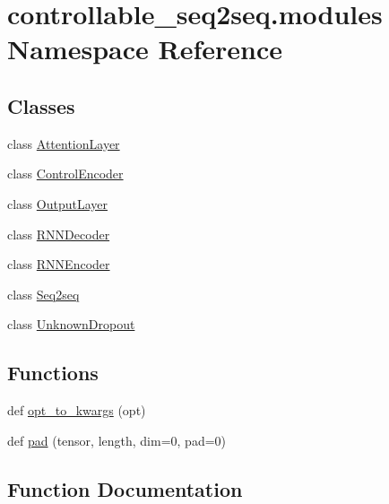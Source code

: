 \hypertarget{namespacecontrollable__seq2seq_1_1modules}{}\section{controllable\+\_\+seq2seq.\+modules Namespace Reference}
\label{namespacecontrollable__seq2seq_1_1modules}
\subsection*{Classes}
\begin{DoxyCompactItemize}
\item 
class \hyperlink{classcontrollable__seq2seq_1_1modules_1_1AttentionLayer}{Attention\+Layer}
\item 
class \hyperlink{classcontrollable__seq2seq_1_1modules_1_1ControlEncoder}{Control\+Encoder}
\item 
class \hyperlink{classcontrollable__seq2seq_1_1modules_1_1OutputLayer}{Output\+Layer}
\item 
class \hyperlink{classcontrollable__seq2seq_1_1modules_1_1RNNDecoder}{R\+N\+N\+Decoder}
\item 
class \hyperlink{classcontrollable__seq2seq_1_1modules_1_1RNNEncoder}{R\+N\+N\+Encoder}
\item 
class \hyperlink{classcontrollable__seq2seq_1_1modules_1_1Seq2seq}{Seq2seq}
\item 
class \hyperlink{classcontrollable__seq2seq_1_1modules_1_1UnknownDropout}{Unknown\+Dropout}
\end{DoxyCompactItemize}
\subsection*{Functions}
\begin{DoxyCompactItemize}
\item 
def \hyperlink{namespacecontrollable__seq2seq_1_1modules_a9e3af31e5044fc5d666f3e212c217ee9}{opt\+\_\+to\+\_\+kwargs} (opt)
\item 
def \hyperlink{namespacecontrollable__seq2seq_1_1modules_a0a1785427c3f3fdbb88c1b3cb0d9020c}{pad} (tensor, length, dim=0, pad=0)
\end{DoxyCompactItemize}


\subsection{Function Documentation}
\mbox{\label{namespacecontrollable__seq2seq_1_1modules_a9e3af31e5044fc5d666f3e212c217ee9}} 
